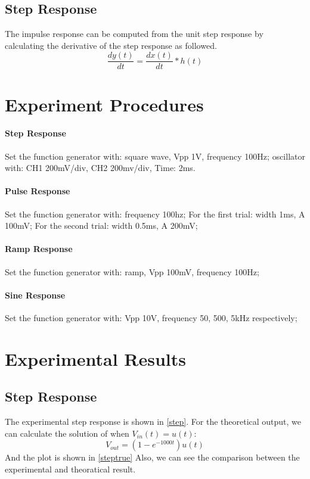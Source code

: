 \documentclass[a4paper]{article}
\begin{document}
    \subsection{Step Response}
    The impulse response can be computed from the unit step response by calculating the derivative of the step response as followed. 
    \begin{equation}
        \frac{dy(t)}{dt} = \frac{dx(t)}{dt}*h(t)
    \end{equation}

    \section{Experiment Procedures}
    \paragraph{Step Response}
    Set the function generator with: square wave, Vpp 1V, frequency 100Hz; oscillator with: CH1 200mV/div, CH2 200mv/div, Time: 2ms.
    \paragraph{Pulse Response}
    Set the function generator with: frequency 100hz; For the first trial: width 1ms, A 100mV; For the second trial: width 0.5ms, A 200mV;
    \paragraph{Ramp Response}
    Set the function generator with: ramp, Vpp 100mV, frequency 100Hz;
    \paragraph{Sine Response}
    Set the function generator with: Vpp 10V, frequency 50, 500, 5kHz respectively;



    \section{Experimental Results}
    \subsection{Step Response}
    The experimental step response is shown in \autoref{step}. For the theoretical output, we can calculate the solution of  when $V_{in}(t) = u(t)$: 
    \begin{equation}
        V_{out} = (1 - e^{-1000t})u(t)
    \end{equation}
    And the plot is shown in \autoref{steptrue} Also, we can see the comparison between the experimental and theoratical result.
\end{document}
